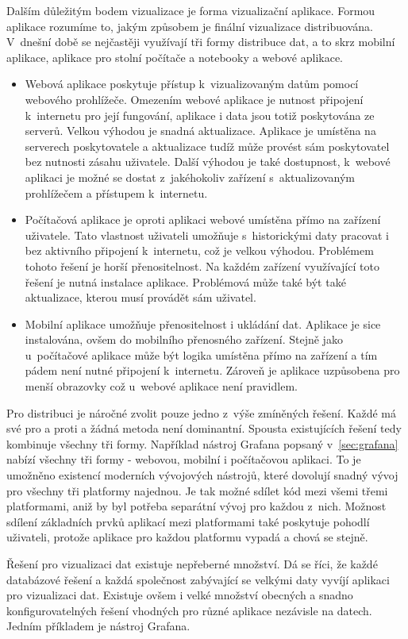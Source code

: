 Dalším důležitým bodem vizualizace je forma vizualizační aplikace. Formou aplikace rozumíme to, jakým způsobem je finální vizualizace distribuována. V~dnešní době se nejčastěji využívají tři formy distribuce dat, a to skrz mobilní aplikace, aplikace pro stolní počítače a notebooky a webové aplikace.
\begin{itemize}
    \item Webová aplikace poskytuje přístup k~vizualizovaným datům pomocí webového prohlížeče. Omezením webové aplikace je nutnost připojení k~internetu pro její fungování, aplikace i data jsou totiž poskytována ze serverů. Velkou výhodou je snadná aktualizace. Aplikace je umístěna na serverech poskytovatele a aktualizace tudíž může provést sám poskytovatel bez nutnosti zásahu uživatele. Další výhodou je také dostupnost, k~webové aplikaci je možné se dostat z~jakéhokoliv zařízení s~aktualizovaným prohlížečem a přístupem k~internetu.
    \item Počítačová aplikace je oproti aplikaci webové umístěna přímo na zařízení uživatele. Tato vlastnost uživateli umožňuje s~historickými daty pracovat i bez aktivního připojení k~internetu, což je velkou výhodou. Problémem tohoto řešení je horší přenositelnost. Na každém zařízení využívající toto řešení je nutná instalace aplikace. Problémová může také být také aktualizace, kterou musí provádět sám uživatel.
    \item Mobilní aplikace umožňuje přenositelnost i ukládání dat. Aplikace je sice instalována, ovšem do mobilního přenosného zařízení. Stejně jako u~počítačové aplikace může být logika umístěna přímo na zařízení a tím pádem není nutné připojení k~internetu. Zároveň je aplikace uzpůsobena pro menší obrazovky což u~webové aplikace není pravidlem.
\end{itemize}
Pro distribuci je náročné zvolit pouze jedno z~výše zmíněných řešení. Každé má své pro a proti a žádná metoda není dominantní. Spousta existujících řešení tedy kombinuje všechny tři formy. Například nástroj Grafana popsaný v~\ref{sec:grafana} nabízí všechny tři formy - webovou, mobilní i počítačovou aplikaci. To je umožněno existencí moderních vývojových nástrojů, které dovolují snadný vývoj pro všechny tři platformy najednou. Je tak možné sdílet kód mezi všemi třemi platformami, aniž by byl potřeba separátní vývoj pro každou z~nich. Možnost sdílení základních prvků aplikací mezi platformami také poskytuje pohodlí uživateli, protože aplikace pro každou platformu vypadá a chová se stejně.

 \label{sec:grafana}
Řešení pro vizualizaci dat existuje nepřeberné množství. Dá se říci, že každé databázové řešení a každá společnost zabývající se velkými daty vyvíjí aplikaci pro vizualizaci dat. Existuje ovšem i velké množství obecných a snadno konfigurovatelných řešení vhodných pro různé aplikace nezávisle na datech. Jedním příkladem je nástroj Grafana.

